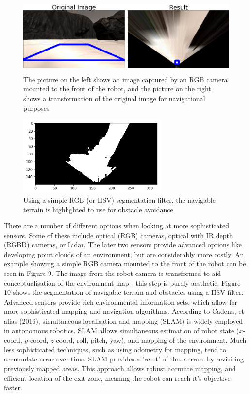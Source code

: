 \documentclass[a4paper]{article}
\begin{document}
\begin{figure}[h]
\centering
\includegraphics[height=4cm]{image4}
\caption{The picture on the left shows an image captured by an RGB camera mounted to the front of the robot, and the picture on the right shows a transformation of the original image for navigational purposes}
\end{figure}

\begin{figure}[h]
\centering
\includegraphics[height=4cm]{image7}
\caption{Using a simple RGB (or HSV) segmentation filter, the navigable terrain is highlighted to use for obstacle avoidance}
\end{figure}

There are a number of different options when looking at more sophisticated sensors. Some of these include optical (RGB) cameras, optical with IR depth (RGBD) cameras, or Lidar. The later two sensors provide advanced options like developing point clouds of an environment, but are considerably more costly. An example showing a simple RGB camera mounted to the front of the robot can be seen in Figure 9. The image from the robot camera is transformed to aid conceptualisation of the environment map - this step is purely aesthetic. Figure 10 shows the segmentation of navigable terrain and obstacles using a HSV filter. Advanced sensors provide rich environmental information sets, which allow for more sophisticated mapping and navigation algorithms. According to Cadena, et alias (2016), simultaneous localisation and mapping (SLAM) is widely employed in autonomous robotics. SLAM allows simultaneous estimation of robot state ($x$-coord, $y$-coord, $z$-coord, roll, pitch, yaw), and mapping of the environment. Much less sophisticated techniques, such as using odometry for mapping, tend to accumulate error over time. SLAM provides a 'reset' of these errors by revisiting previously mapped areas. This approach allows robust accurate mapping, and efficient location of the exit zone, meaning the robot can reach it's objective faster.
\end{document}
